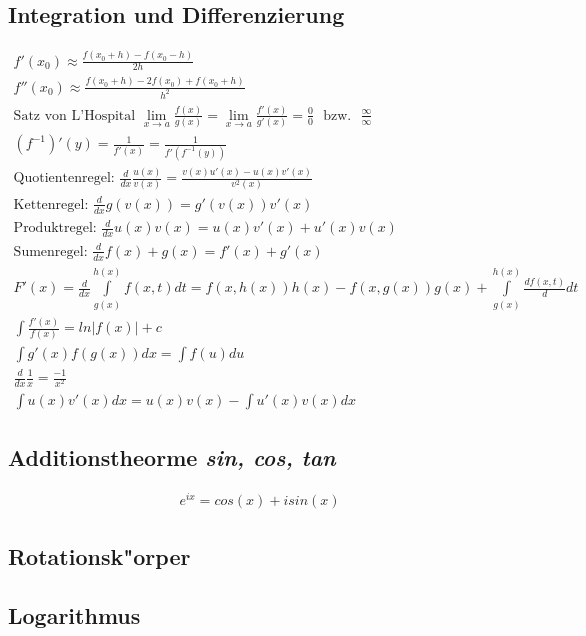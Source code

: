 \subsection{Integration und Differenzierung}
	\begin{align*}
		f'(x_0) \approx \frac{f(x_0 + h) - f(x_0 - h)}{2h} \\
		f''(x_0) \approx \frac{f(x_0 + h) - 2f(x_0) + f(x_0 + h)}{h^2} \\
		\text{Satz von L'Hospital	} \lim\limits_{x \to a} \frac{f(x)}{g(x)} = \lim\limits_{x \to a} \frac{f'(x)}{g'(x)} = \frac{0}{0} \text{ ~bzw.~ } \frac{\infty}{\infty} \\
		(f^{-1})'(y) = \frac{1}{f'(x)} = \frac{1}{f'(f^{-1}(y))} \\
		\text{Quotientenregel: } \frac{d}{dx} \frac{u(x)}{v(x)} = \frac{v(x)u'(x) - u(x)v'(x)}{v^2(x)} \\
		\text{Kettenregel: } \frac{d}{dx} g(v(x)) = g'(v(x))v'(x) \\
		\text{Produktregel: } \frac{d}{dx} u(x)v(x) = u(x)v'(x) + u'(x)v(x) \\
		\text{Sumenregel: } \frac{d}{dx} f(x) + g(x) = f'(x) + g'(x) \\
		F'(x) = \frac{d}{dx} \int\limits_{g(x)}^{h(x)} f(x,t) dt = f(x, h(x))h(x) - f(x,g(x))g(x) + \int\limits_{g(x)}^{h(x)} \frac{d f(x,t)}{d} dt \\
		\int \frac{f'(x)}{f(x)} = ln | f(x) | + c \\
		\int g'(x)f(g(x)) dx = \int f(u) du \\
		\frac{d}{dx} \frac{1}{x} = \frac{-1}{x^2} \\
		\int u(x)v'(x) dx = u(x)v(x) - \int u'(x)v(x) dx
	\end{align*}

\subsection{Additionstheorme \textit{sin, cos, tan}}
	\begin{align*}
		e^{ix} = cos(x) + i sin(x)
	\end{align*}

\subsection{Rotationsk"orper}

\subsection{Logarithmus}

